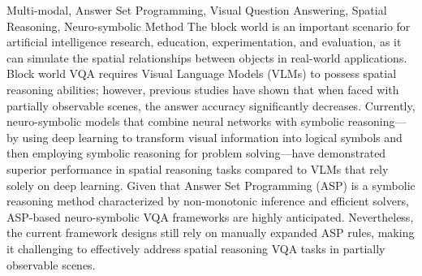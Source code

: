 \begin{englishabstract}{Multi-modal, Answer Set Programming, Visual Question Answering, Spatial Reasoning, Neuro-symbolic Method}
The block world is an important scenario for artificial intelligence research, education, experimentation, and evaluation, as it can simulate the spatial relationships between objects in real-world applications. Block world VQA requires Visual Language Models (VLMs) to possess spatial reasoning abilities; however, previous studies have shown that when faced with partially observable scenes, the answer accuracy significantly decreases. Currently, neuro-symbolic models that combine neural networks with symbolic reasoning—by using deep learning to transform visual information into logical symbols and then employing symbolic reasoning for problem solving—have demonstrated superior performance in spatial reasoning tasks compared to VLMs that rely solely on deep learning. Given that Answer Set Programming (ASP) is a symbolic reasoning method characterized by non-monotonic inference and efficient solvers, ASP-based neuro-symbolic VQA frameworks are highly anticipated. Nevertheless, the current framework designs still rely on manually expanded ASP rules, making it challenging to effectively address spatial reasoning VQA tasks in partially observable scenes.


\end{englishabstract}
